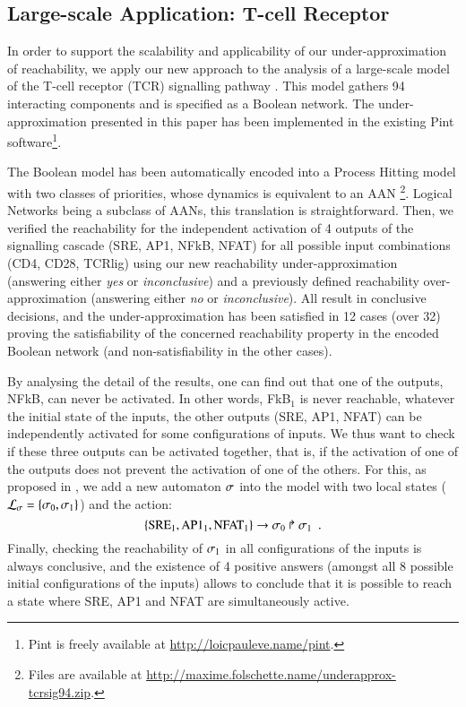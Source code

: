 \subsection{Large-scale Application: T-cell Receptor}
\label{ssec:ex-tcrsig}

In order to support the scalability and applicability of our under-approximation of reachability, we
apply our new approach to the analysis of a large-scale model of the T-cell receptor (TCR)
signalling pathway \cite{tcrsig94}.
This model gathers 94 interacting components and is specified as a Boolean network.
The under-approximation presented in this paper has been implemented in the existing Pint
software\footnote{Pint is freely available at \url{http://loicpauleve.name/pint}.}.

The Boolean model has been automatically encoded into
a Process Hitting model with two classes of priorities,
whose dynamics is equivalent to an AAN%
\footnote{Files are available at
\url{http://maxime.folschette.name/underapprox-tcrsig94.zip}.}.
Logical Networks being a subclass of AANs, this translation is straightforward.
Then, we verified the reachability for the independent activation of 4 outputs of the signalling
cascade (SRE, AP1, NFkB, NFAT) for all possible input combinations (CD4, CD28, TCRlig) using our
new reachability under-approximation (answering either \emph{yes} or \emph{inconclusive}) and a 
previously defined reachability over-approximation \cite{PMR12-MSCS} (answering either \emph{no} or
\emph{inconclusive}).
All result in conclusive decisions, and the under-approximation has been satisfied in 12 cases (over
32) proving the satisfiability of the concerned reachability property in the encoded Boolean network
(and non-satisfiability in the other cases).

By analysing the detail of the results, one can find out that one of the outputs, NFkB, can never be activated.
In other words, FkB$_1$ is never reachable, whatever the initial state of the inputs,
the other outputs (SRE, AP1, NFAT) can be independently activated
for some configurations of inputs.
We thus want to check if these three outputs can be activated together,
that is, if the activation of one of the outputs does not prevent the activation of one of the others.
For this, as proposed in ,
we add a new automaton $\sigma$ into the model
with two local states ($\mathcal{L}_\sigma = \{ \sigma_0, \sigma_1 \}$)
and the action:
\[ \{\text{SRE}_1, \text{AP1}_1, \text{NFAT}_1\}\rightarrow\sigma_0\Rsh\sigma_1 \enspace. \]
Finally, checking the reachability of $\sigma_1$ in all configurations of the inputs
is always conclusive,
and the existence of 4 positive answers
(amongst all 8 possible initial configurations of the inputs) allows to conclude that
it is possible to reach a state where SRE, AP1 and NFAT are simultaneously active.

